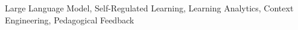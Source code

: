 \documentclass[conference,a4paper]{IEEEtran}
\begin{document}
\begin{abstract}


\end{abstract}

\begin{IEEEkeywords}
Large Language Model, Self-Regulated Learning, Learning Analytics, 
Context Engineering, Pedagogical Feedback
\end{IEEEkeywords}


\end{document}
